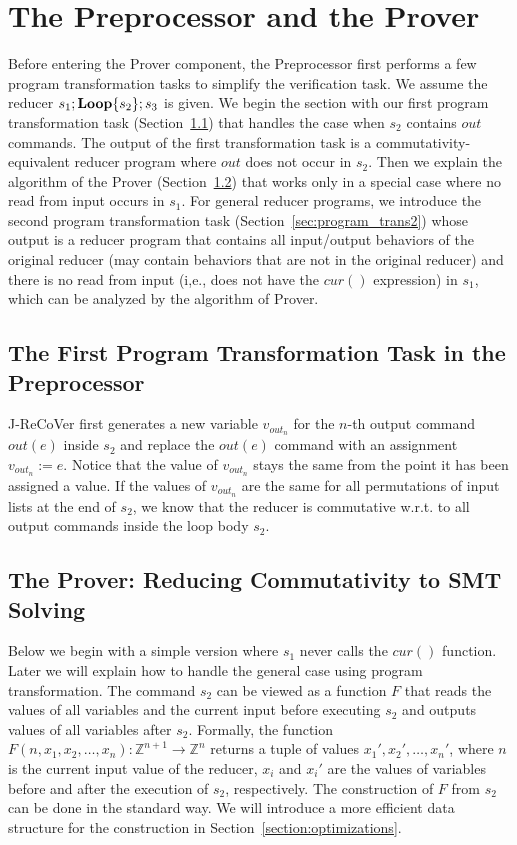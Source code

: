 \documentclass{llncs}
\newcommand{\cur}{cur()}
\newcommand{\rloop}{
	\ifmmode 
	\mathbf{Loop}
	\else
	\textbf{Loop}
	\fi}
\newcommand{\Z}{\mathbb{Z}}
\begin{document}
\section{The Preprocessor and the Prover}
\label{sec:preprocessor_prover}

Before entering the Prover component, the Preprocessor first performs a few program transformation tasks to simplify the verification task. 
We assume the reducer $s_1;\rloop\{s_2\};s_3$ is given. We begin the section with our first program transformation task (Section~\ref{sec:program_trans1}) that handles the case when $s_2$ contains $out$ commands. The output of the first transformation task is a commutativity-equivalent reducer program where $out$ does not occur in $s_2$.  Then we explain the algorithm of the Prover (Section~\ref{sec:prover}) that works only in a special case where no read from input occurs in $s_1$. For general reducer programs, we introduce the second program transformation task (Section~\ref{sec:program_trans2}) whose output is a reducer program that contains all input/output behaviors of the original reducer (may contain behaviors that are not in the original reducer) and there is no read from input (i,e., does not have the $\cur$ expression) in $s_1$, which can be analyzed by the algorithm of Prover.  

\subsection{The First Program Transformation Task in the Preprocessor}
\label{sec:program_trans1}
J-ReCoVer  first generates a new variable $v_{out_n}$ for the $n$-th output command $out(e)$ inside $s_2$ and replace the $out(e)$ command with an assignment $v_{out_n}:=e$. 
Notice that the value of $v_{out_n}$ stays the same from the point it has been assigned a value. 
If the values of $v_{out_n}$ are the same for all permutations of input lists at the end of $s_2$, we know that the reducer is commutative w.r.t. to all output commands inside the loop body $s_2$.

\subsection{The Prover: Reducing Commutativity to SMT Solving}
\label{sec:prover}
Below we begin with a simple version where $s_1$ never calls the $\cur$ function. Later we will explain how to handle the general case using program transformation. The command $s_2$ can be viewed as a function $F$ that reads the values of all variables and the current input before executing $s_2$ and outputs values of all variables after $s_2$. Formally, the function $F(n,x_1,x_2,\ldots,x_n): \Z^{n+1} \rightarrow \Z^n$ returns a tuple of values $x_1',x_2',\ldots,x_n'$, where $n$ is the current input value of the reducer, $x_i$ and $x_i'$ are the values of variables before and after the execution of $s_2$, respectively. The construction of $F$ from $s_2$ can be done in the standard way. We will introduce a more efficient data structure for the construction in Section~\ref{section:optimizations}.
\end{document}
